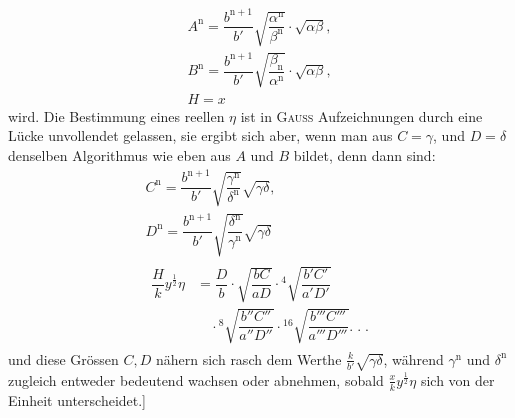\[
\begin{gathered}A^{\mathrm n}=\dfrac{b^{\mathrm n+1}}{b'}\surd{\dfrac{\alpha^{\mathrm n}}{\beta^{\mathrm n}}}\cdot\surd{\alpha\beta},\\[9pt]
B^{\mathrm n}=\dfrac{b^{\mathrm n+1}}{b'}\surd{\dfrac{\beta_{\mathrm n}}{\alpha^{\mathrm n}}}\cdot\surd{\alpha\beta},\\[9pt] H=x\end{gathered}
\]
wird. Die Bestimmung eines reellen $\eta$ ist in \textsc{Gauss} Aufzeichnungen durch eine Lücke unvollendet gelassen,
sie ergibt sich aber, wenn man aus $C=\gamma$, und $D=\delta$ denselben Algorithmus wie eben aus $A$ und $B$ bildet, denn dann sind:
\[
\begin{gathered}
C^{\mathrm n}=\dfrac{b^{\mathrm n+1}}{b'}\surd{\dfrac{\gamma^{\mathrm n}}{\delta^{\mathrm n}}}\surd{\gamma\delta},\\[7pt]
D^{\mathrm n}=\dfrac{b^{\mathrm n+1}}{b'}\surd{\dfrac{\delta^{\mathrm n}}{\gamma^{\mathrm n}}}\surd{\gamma\delta}\\
\begin{aligned}\dfrac{H}{k}y^{\frac12}\eta&=\dfrac{D}{b}\cdot\surd{\dfrac{bC}{aD}}\cdot
{}^{4}\!\surd{\dfrac{b'C'}{a'D'}}\\&\quad\cdot{}^{8}\!\surd{\dfrac{b''C''}{a''D''}}\cdot
{}^{16}\!\surd{\dfrac{b'''C'''}{a'''D'''}}.\;.\;.\end{aligned}\end{gathered}
\]
und diese Grössen $C,\allowbreak D$ nähern sich rasch dem Werthe $\frac{k}{b'}\surd{\gamma\delta}$,
während $\gamma^{\mathrm n}$ und $\delta^{\mathrm n}$ zugleich entweder bedeutend wachsen oder abnehmen,
sobald $\frac{x}{k}y^{\frac12}\eta$ sich von der Einheit unterscheidet.]


